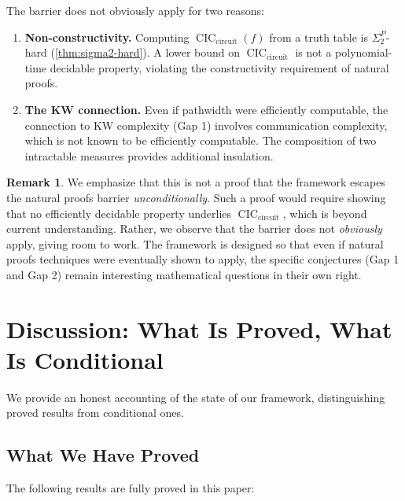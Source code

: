 \documentclass[11pt]{article}
\theoremstyle{plain}
\theoremstyle{definition}
\newtheorem{remark}[theorem]{Remark}
\newcommand{\CIC}{\operatorname{CIC}}
\newcommand{\CICcirc}{\CIC_{\text{circuit}}}
\begin{document}
The barrier does not obviously apply for two reasons:

\begin{enumerate}
    \item \textbf{Non-constructivity.} Computing $\CICcirc(f)$ from a truth table is $\Sigma_2^P$-hard (\cref{thm:sigma2-hard}). A lower bound on $\CICcirc$ is not a polynomial-time decidable property, violating the constructivity requirement of natural proofs.
    
    \item \textbf{The KW connection.} Even if pathwidth were efficiently computable, the connection to KW complexity (Gap 1) involves communication complexity, which is not known to be efficiently computable. The composition of two intractable measures provides additional insulation.
\end{enumerate}

\begin{remark}
We emphasize that this is not a proof that the framework escapes the natural proofs barrier \emph{unconditionally}. Such a proof would require showing that no efficiently decidable property underlies $\CICcirc$, which is beyond current understanding. Rather, we observe that the barrier does not \emph{obviously} apply, giving room to work. The framework is designed so that even if natural proofs techniques were eventually shown to apply, the specific conjectures (Gap 1 and Gap 2) remain interesting mathematical questions in their own right.
\end{remark}


\section{Discussion: What Is Proved, What Is Conditional}\label{sec:discussion}

We provide an honest accounting of the state of our framework, distinguishing proved results from conditional ones.

\subsection{What We Have Proved}

The following results are fully proved in this paper:
\end{document}
